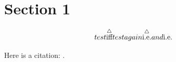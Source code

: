 \section{Section 1}
$$test \ssid test again \ied and \idest$$


Here is a citation: \cite{bell1964}.